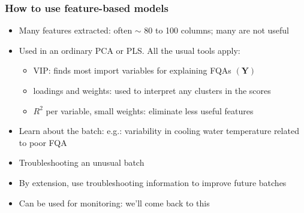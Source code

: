 \documentclass[handout, 12pt]{beamer}
\begin{document}
\begin{frame}\frametitle{How to use feature-based models}

\begin{itemize}
	\item	Many features extracted: often \( \sim \) 80 to 100 columns; many are not useful
	
	\item	Used in an ordinary PCA or PLS.  All the usual tools apply:
	
			\begin{itemize}
				\item	VIP: finds most import variables for explaining FQAs \( (\mathbf{Y}) \)
				
				\item	loadings and weights: used to interpret any clusters in the scores
				
				\item	\( R^2 \) per variable, small weights: eliminate less useful features
			\end{itemize}\pause
	
	\item	Learn about the batch: {\small e.g.: variability in cooling water temperature related to poor FQA}
	
	\item	Troubleshooting an unusual batch 

	\item	By extension, use troubleshooting information to improve future batches \pause
	
	\item	Can be used for monitoring: we'll come back to this
\end{itemize}
\end{frame}
\end{document}
